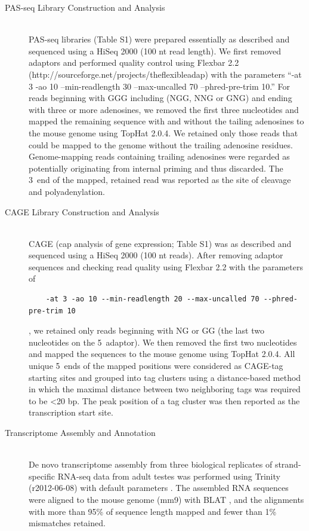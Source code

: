 \begin{description}
    \item[PAS-seq Library Construction and Analysis] \hfill \\
    PAS-seq libraries (Table S1) were prepared essentially as described \citep{Shepard2011} and sequenced using a HiSeq 2000 (100 nt read length). We first removed adaptors and performed quality control using Flexbar 2.2 (http://sourceforge.net/projects/theflexibleadap) with the parameters ``-at 3 -ao 10 --min-readlength 30 --max-uncalled 70 --phred-pre-trim 10.'' For reads beginning with GGG including (NGG, NNG or GNG) and ending with three or more adenosines, we removed the first three nucleotides and mapped the remaining sequence with and without the tailing adenosines to the mouse genome using TopHat 2.0.4. We retained only those reads that could be mapped to the genome without the trailing adenosine residues. Genome-mapping reads containing trailing adenosines were regarded as potentially originating from internal priming and thus discarded. The 3\textprime~end of the mapped, retained read was reported as the site of cleavage and polyadenylation.

    \item[CAGE Library Construction and Analysis] \hfill \\
    CAGE (cap analysis of gene expression; Table S1) was as described \citep{Yang2011} and sequenced using a HiSeq 2000 (100 nt reads). After removing adaptor sequences and checking read quality using Flexbar 2.2 with the parameters of 
    \lstset{language=BASH}
    \begin{lstlisting}
    -at 3 -ao 10 --min-readlength 20 --max-uncalled 70 --phred-pre-trim 10
    \end{lstlisting}
    , we retained only reads beginning with NG or GG (the last two nucleotides on the 5\textprime~adaptor). We then removed the first two nucleotides and mapped the sequences to the mouse genome using TopHat 2.0.4. All unique 5\textprime~ends of the mapped positions were considered as CAGE-tag starting sites and grouped into tag clusters using a distance-based method in which the maximal distance between two neighboring tags was required to be <20 bp. The peak position of a tag cluster was then reported as the transcription start site.

    \item[Transcriptome Assembly and Annotation] \hfill \\
    De novo transcriptome assembly from three biological replicates of strand-specific RNA-seq data from adult testes was performed using Trinity (r2012-06-08) with default parameters \citep{Grabherr2011}. The assembled RNA sequences were aligned to the mouse genome (mm9) with BLAT \citep{Kent2002}, and the alignments with more than 95\% of sequence length mapped and fewer than 1\% mismatches retained.


\end{description}
